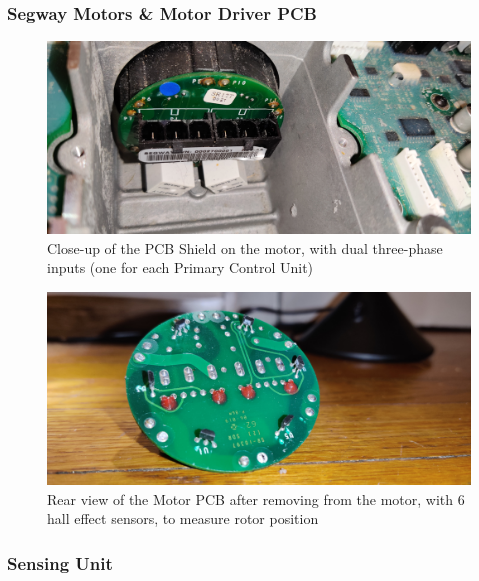 \documentclass[]{formalLabReport}
\begin{document}
\subsubsection{Segway Motors \& Motor Driver PCB}

\begin{figure}
    \includegraphics[]{segwayMotorInternal.jpg}
    \caption{Close-up of the PCB Shield on the motor, with dual three-phase inputs (one for each Primary Control Unit)}
    \label{fig:segwayMotorInternal.jpg}
\end{figure}

\begin{figure}
    \includegraphics[]{segwayMotorPCBRear.jpg}
    \caption{Rear view of the Motor PCB after removing from the motor, with 6 hall effect sensors, to measure rotor position}
    \label{fig:segwayMotorPCBRear.jpg}
\end{figure}

\subsubsection{Sensing Unit}
\end{document}
